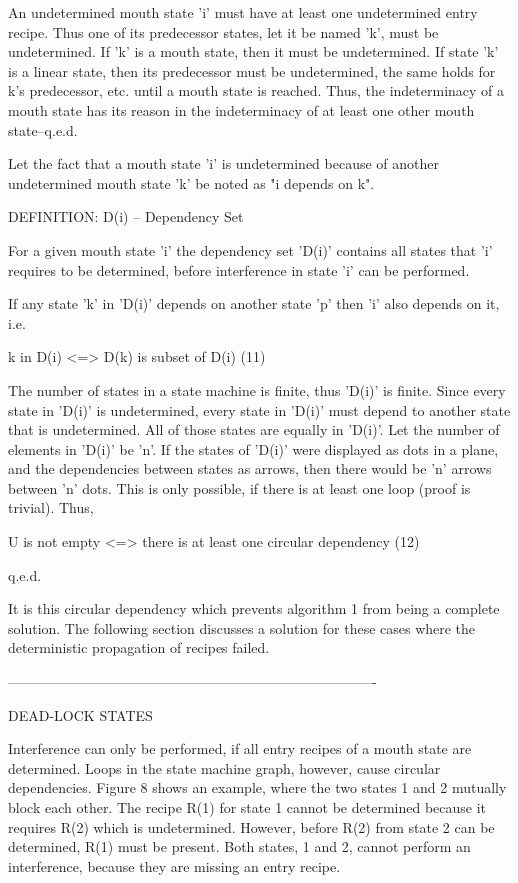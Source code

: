 \documentclass[12pt]{article}
\begin{document}
An undetermined mouth state 'i' must have at least one undetermined entry
recipe. Thus one of its predecessor states, let it be named 'k', must be
undetermined. If 'k' is a mouth state, then it must be undetermined.  If state
'k' is a linear state, then its predecessor must be undetermined, the same
holds for k's predecessor, etc. until a mouth state is reached. Thus, the
indeterminacy of a mouth state has its reason in the indeterminacy of at least
one other mouth state--q.e.d. 

Let the fact that a mouth state 'i' is undetermined because of another undetermined
mouth state 'k' be noted as "i depends on k". 

DEFINITION: D(i) -- Dependency Set 

    For a given mouth state 'i' the dependency set 'D(i)' contains all states
    that 'i' requires to be determined, before interference in state 'i' can be
    performed.

If any state 'k' in 'D(i)' depends on another state 'p' then 'i' also depends
on it, i.e.

                   k in D(i) <=> D(k) is subset of D(i)                    (11)

The number of states in a state machine is finite, thus 'D(i)' is finite. Since
every state in 'D(i)' is undetermined, every state in 'D(i)' must depend to
another state that is undetermined. All of those states are equally in 'D(i)'.
Let the number of elements in 'D(i)' be 'n'. If the states of 'D(i)' were
displayed as dots in a plane, and the dependencies between states as arrows,
then there would be 'n' arrows between 'n' dots. This is only
possible, if there is at least one loop (proof is trivial). Thus, 

         U is not empty <=> there is at least one circular dependency      (12)

q.e.d.

It is this circular dependency which prevents algorithm 1 from being a complete
solution. The following section discusses a solution for these cases where 
the deterministic propagation of recipes failed.

-------------------------------------------------------------------------------

DEAD-LOCK STATES

Interference can only be performed, if all entry recipes of a mouth state are
determined. Loops in the state machine graph, however, cause circular
dependencies.  Figure 8 shows an example, where the two states 1 and 2 mutually
block each other. The recipe R(1) for state 1 cannot be determined because it
requires R(2) which is undetermined. However, before R(2) from state 2 can be
determined, R(1) must be present. Both states, 1 and 2, cannot perform an
interference, because they are missing an entry recipe. 
\end{document}
